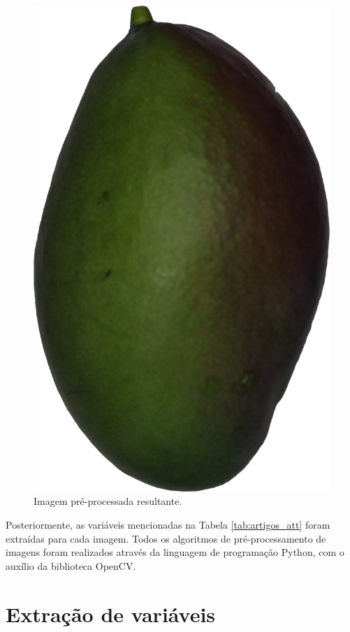 \begin{figure}[H]
\centering
    \caption{Imagem pré-processada resultante.}\label{fig:prep}
    \includegraphics[scale=0.03]{img/cut.jpg}
\end{figure}

Posteriormente, as variáveis mencionadas na Tabela \ref{tab:artigos_att} foram extraídas para cada imagem. Todos os algoritmos de pré-processamento de imagens foram realizados através da linguagem de programação Python, com o auxílio da biblioteca OpenCV.

\section{Extração de variáveis}

